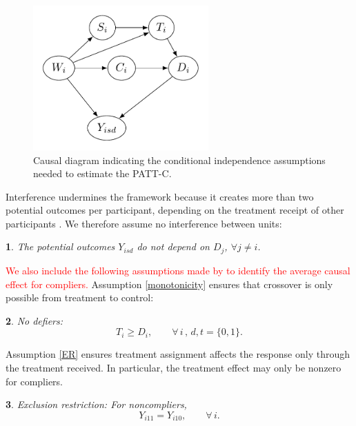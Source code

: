 \documentclass[hidelinks,12pt]{article}
\makeatletter
\newtheorem*{assumption*}{\assumptionnumber}
\providecommand{\assumptionnumber}{}
\newenvironment{assumption}[2]
 {%
  \renewcommand{\assumptionnumber}{Assumption #1}%
  \begin{assumption*}%
  \protected@edef\@currentlabel{#1}%
 }
 {%
  \end{assumption*}
 }
\makeatother
\begin{document}
\begin{figure}[htb]
	\begin{center}
		\includegraphics[width = 0.6\textwidth]{DAG2.png}
		\caption{Causal diagram indicating the conditional independence assumptions needed to estimate the PATT-C.\label{fig:DAG}}
	\end{center}
\end{figure}

Interference undermines the framework because it creates more than two potential outcomes per participant, depending on the treatment receipt of other participants \citep{rubin1990}. We therefore assume no interference between units: 

\vskip 0.2in
\begin{assumption}{5}{}\label{sutva}
	The potential outcomes $Y_{isd}$ do not depend on $D_j$, $\forall j\neq i$. 
\end{assumption} 

\textcolor{red}{We also include the following assumptions made by \citet{Angrist1996} to identify the average
causal effect for compliers.} Assumption \eqref{monotonicity} ensures that crossover is only possible from treatment to control:

\vskip 0.2in
\begin{assumption}{6}{}\label{monotonicity}
No defiers: 
\begin{equation*}
T_i \geq D_i, \qquad \forall \, i \, , \, d, t=\{0,1\}.
\end{equation*}
\end{assumption}
\noindent
Assumption \eqref{ER} ensures treatment assignment affects the response only through the treatment received. In particular, the treatment effect may only be nonzero for compliers.

\begin{assumption}{7}{}\label{ER}
Exclusion restriction: For noncompliers,
\begin{equation*}
Y_{i11} = Y_{i10}, \qquad \forall \, i.
\end{equation*}  
\end{assumption}
\end{document}
